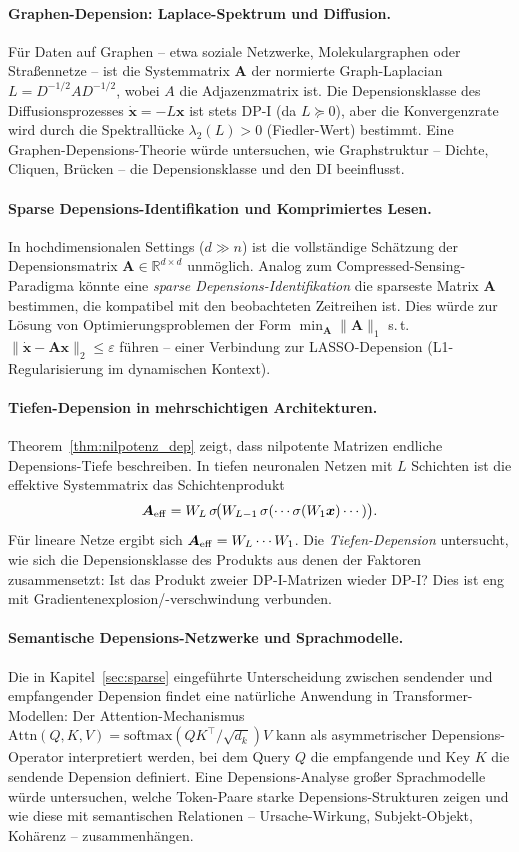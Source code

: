 ﻿\documentclass[12pt, a4paper]{article}
\theoremstyle{definition}
\theoremstyle{remark}
\newcommand{\R}{\mathbb{R}}
\newcommand{\vx}{\bm{x}}
\newcommand{\vA}{\bm{A}}
\newcommand{\T}{\top}
\begin{document}
\paragraph{Graphen-Depension: Laplace-Spektrum und Diffusion.}
Für Daten auf Graphen -- etwa soziale Netzwerke, Molekulargraphen oder Straßennetze
-- ist die Systemmatrix $\vA$ der normierte Graph-Laplacian $L = D^{-1/2}AD^{-1/2}$,
wobei $A$ die Adjazenzmatrix ist. Die Depensionsklasse des Diffusionsprozesses
$\dot{\vx} = -L\vx$ ist stets DP-I (da $L \succeq 0$), aber die Konvergenzrate
wird durch die Spektrallücke $\lambda_2(L) > 0$ (Fiedler-Wert) bestimmt. Eine
Graphen-Depensions-Theorie würde untersuchen, wie Graphstruktur -- Dichte, Cliquen,
Brücken -- die Depensionsklasse und den DI beeinflusst.

\paragraph{Sparse Depensions-Identifikation und Komprimiertes Lesen.}
In hochdimensionalen Settings ($d \gg n$) ist die vollständige Schätzung der
Depensionsmatrix $\vA \in \R^{d \times d}$ unmöglich. Analog zum Compressed-Sensing-
Paradigma könnte eine \emph{sparse Depensions-Identifikation} die sparseste Matrix
$\vA$ bestimmen, die kompatibel mit den beobachteten Zeitreihen ist. Dies würde zur
Lösung von Optimierungsproblemen der Form
$\min_{\vA} \|\vA\|_1$ s.\,t.\ $\|\dot{\vx} - \vA\vx\|_2 \leq \varepsilon$
führen -- einer Verbindung zur LASSO-Depension
(L1-Regularisierung im dynamischen Kontext).

\paragraph{Tiefen-Depension in mehrschichtigen Architekturen.}
Theorem~\ref{thm:nilpotenz_dep} zeigt, dass nilpotente Matrizen endliche
Depensions-Tiefe beschreiben. In tiefen neuronalen Netzen mit $L$ Schichten ist
die effektive Systemmatrix das Schichtenprodukt
\[
  \vA_{\rm eff} = W_L\,\sigma\!\bigl(W_{L-1}\,\sigma(\cdots\sigma(W_1 \vx)\cdots)\bigr).
\]
Für lineare Netze ergibt sich $\vA_{\rm eff} = W_L\cdots W_1$. Die
\emph{Tiefen-Depension} untersucht, wie sich die Depensionsklasse des Produkts
aus denen der Faktoren zusammensetzt: Ist das Produkt zweier DP-I-Matrizen
wieder DP-I? Dies ist eng mit Gradientenexplosion/-verschwindung verbunden.

\paragraph{Semantische Depensions-Netzwerke und Sprachmodelle.}
Die in Kapitel~\ref{sec:sparse} eingeführte Unterscheidung zwischen sendender und
empfangender Depension findet eine natürliche Anwendung in Transformer-Modellen:
Der Attention-Mechanismus $\mathrm{Attn}(Q,K,V) = \mathrm{softmax}(QK^\T/\sqrt{d_k})V$
kann als asymmetrischer Depensions-Operator interpretiert werden, bei dem Query $Q$
die empfangende und Key $K$ die sendende Depension definiert. Eine Depensions-Analyse
großer Sprachmodelle würde untersuchen, welche Token-Paare starke Depensions-Strukturen
zeigen und wie diese mit semantischen Relationen -- Ursache-Wirkung, Subjekt-Objekt,
Kohärenz -- zusammenhängen.
\end{document}

